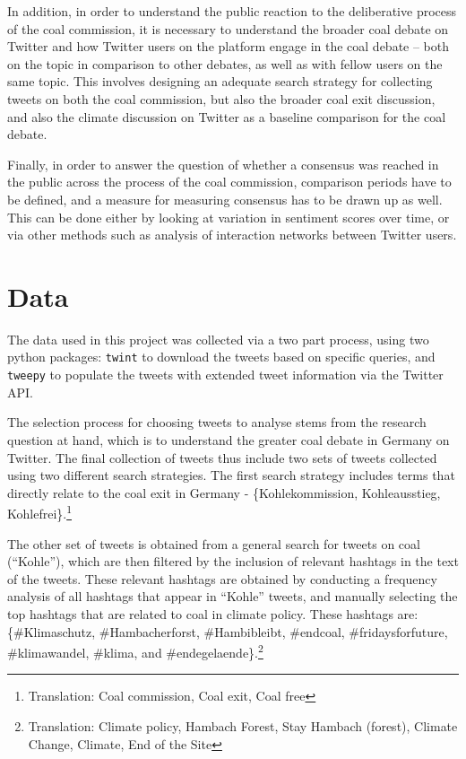 \documentclass[12pt,onecolumn,twoside]{layout}
\begin{document}
In addition, in order to understand the public reaction to the deliberative process of the coal commission, it is necessary to understand the broader coal debate on Twitter and how Twitter users on the platform engage in the coal debate -- both on the topic in comparison to other debates, as well as with fellow users on the same topic. This involves designing an adequate search strategy for collecting tweets on both the coal commission, but also the broader coal exit discussion, and also the climate discussion on Twitter as a baseline comparison for the coal debate. 

Finally, in order to answer the question of whether a consensus was reached in the public across the process of the coal commission, comparison periods have to be defined, and a measure for measuring consensus has to be drawn up as well. This can be done either by looking at variation in sentiment scores over time, or via other methods such as analysis of interaction networks between Twitter users. 

\section*{Data} \label{sec:data}
The data used in this project was collected via a two part process, using two python packages: \texttt{twint} to download the tweets based on specific queries, and \texttt{tweepy} to populate the tweets with extended tweet information via the Twitter API. 

The selection process for choosing tweets to analyse stems from the research question at hand, which is to understand the greater coal debate in Germany on Twitter. The final collection of tweets thus include two sets of tweets collected using two different search strategies. The first search strategy includes terms that directly relate to the coal exit in Germany - \{Kohlekommission, Kohleausstieg, Kohlefrei\}.\footnote{Translation: Coal commission, Coal exit, Coal free}

The other set of tweets is obtained from a general search for tweets on coal (``Kohle''), which are then filtered by the inclusion of relevant hashtags in the text of the tweets. These relevant hashtags are obtained by conducting a frequency analysis of all hashtags that appear in ``Kohle'' tweets, and manually selecting the top hashtags that are related to coal in climate policy. These hashtags are:  \{\#Klimaschutz, \#Hambacherforst, \#Hambibleibt, \#endcoal, \#fridaysforfuture, \#klimawandel, \#klima, and \#endegelaende\}.\footnote{Translation: Climate policy, Hambach Forest, Stay Hambach (forest), Climate Change, Climate, End of the Site} 
\end{document}
